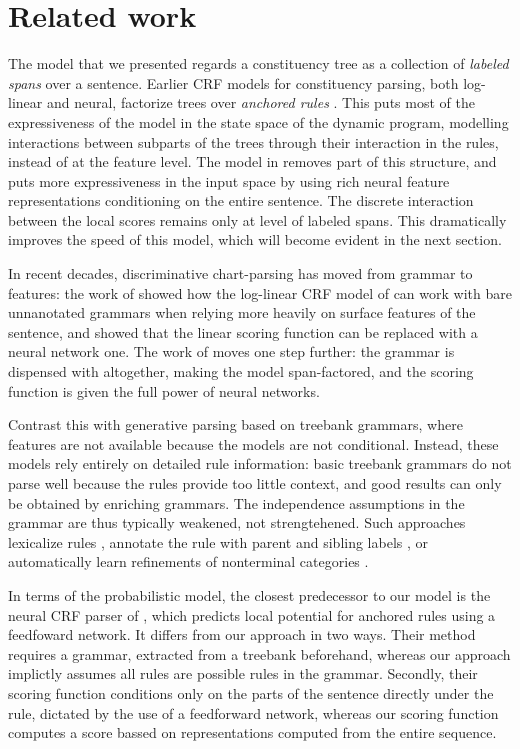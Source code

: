 \section{Related work}
  The model that we presented regards a constituency tree as a collection of \textit{labeled spans} over a sentence. Earlier CRF models for constituency parsing, both log-linear and neural, factorize trees over \textit{anchored rules} \citep{finkel2008crf,klein2015crf}. This puts most of the expressiveness of the model in the state space of the dynamic program, modelling interactions between subparts of the trees through their interaction in the rules, instead of at the feature level. The model in \citet{stern2017minimal} removes part of this structure, and puts more expressiveness in the input space by using rich neural feature representations conditioning on the entire sentence. The discrete interaction between the local scores remains only at level of labeled spans. This dramatically improves the speed of this model, which will become evident in the next section.

  In recent decades, discriminative chart-parsing has moved from grammar to features: the work of \citet{hall2014less} showed how the log-linear CRF model of \cite{finkel2008crf} can work with bare unnanotated grammars when relying more heavily on surface features of the sentence, and \citet{klein2015crf} showed that the linear scoring function can be replaced with a neural network one. The work of \citep{stern2017minimal} moves one step further: the grammar is dispensed with altogether, making the model span-factored, and the scoring function is given the full power of neural networks.

  Contrast this with generative parsing based on treebank grammars, where features are not available because the models are not conditional. Instead, these models rely entirely on detailed rule information: basic treebank grammars do not parse well because the rules provide too little context, and good results can only be obtained by enriching grammars. The independence assumptions in the grammar are thus typically weakened, not strengtehened. Such approaches lexicalize rules \citep{collins2003head}, annotate the rule with parent and sibling labels \citep{klein2003accurate}, or automatically learn refinements of nonterminal categories \citep{petrov2006learning}.

  In terms of the probabilistic model, the closest predecessor to our model is the neural CRF parser of \citet{klein2015crf}, which predicts local potential for anchored rules using a feedfoward network. It differs from our approach in two ways. Their method requires a grammar, extracted from a treebank beforehand, whereas our approach implictly assumes all rules are possible rules in the grammar. Secondly, their scoring function conditions only on the parts of the sentence directly under the rule, dictated by the use of a feedforward network, whereas our scoring function computes a score bassed on representations computed from the entire sequence.

